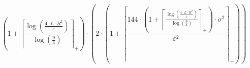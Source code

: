 \[\left(1 + \left\lceil \frac{\log\left(\frac{4 \cdot L \cdot R^{2}}{\varepsilon}\right)}{\log\left(\frac{9}{4}\right)} \right\rceil_{+}\right) \cdot \left(2 \cdot \left(1 + \left\lceil \frac{144 \cdot \left(1 + \left\lceil \frac{\log\left(\frac{4 \cdot L \cdot R^{2}}{\varepsilon}\right)}{\log\left(\frac{9}{4}\right)} \right\rceil_{+}\right) \cdot \sigma^{2}}{\varepsilon^{2}} \right\rceil_{+}\right)\right)\]
